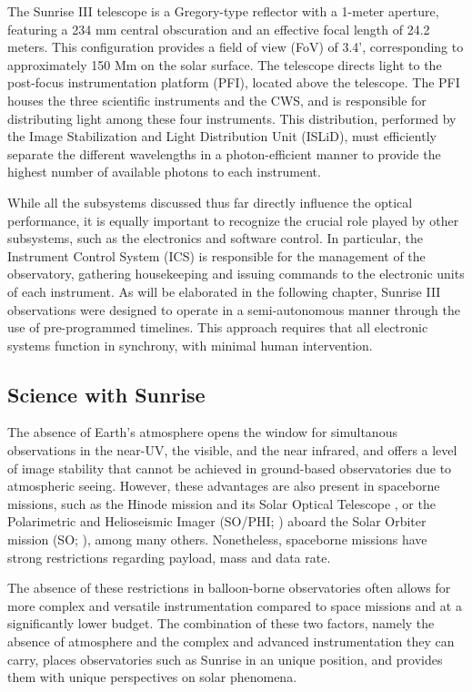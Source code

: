 The Sunrise III telescope is a Gregory-type reflector with a 1-meter aperture, featuring a 234 mm central obscuration and an effective focal length of 24.2 meters. This configuration provides a field of view (FoV) of 3.4', corresponding to approximately 150 Mm on the solar surface. The telescope directs light to the post-focus instrumentation platform (PFI), located above the telescope. The PFI houses the three scientific instruments and the CWS, and is responsible for distributing light among these four instruments. This distribution, performed by the Image Stabilization and Light Distribution Unit (ISLiD), must efficiently separate the different wavelengths in a photon-efficient manner to provide the highest number of available photons to each instrument. 

While all the subsystems discussed thus far directly influence the optical performance, it is equally important to recognize the crucial role played by other subsystems, such as the electronics and software control. In particular, the Instrument Control System (ICS) is responsible for the management of the observatory, gathering housekeeping and issuing commands to the electronic units of each instrument. As will be elaborated in the following chapter, Sunrise III observations were designed to operate in a semi-autonomous manner through the use of pre-programmed timelines. This approach requires that all electronic systems function in synchrony, with minimal human intervention. 

\subsection{Science with Sunrise}

The absence of Earth's atmosphere opens the window for simultanous observations in the near-UV, the visible, and the near infrared, and offers a level of image stability that cannot be achieved in ground-based observatories due to atmospheric seeing. However, these advantages are also present in spaceborne missions, such as the Hinode mission \citep{Hinode} and its Solar Optical Telescope \citep{sot}, or the Polarimetric and Helioseismic Imager (SO/PHI; \citealt{PHI}) aboard the Solar Orbiter mission (SO; \citealt{SO}), among many others. Nonetheless, spaceborne missions have strong restrictions regarding payload, mass and data rate. 

The absence of these restrictions in balloon-borne observatories often allows for more complex and versatile instrumentation compared to space missions and at a significantly lower budget. The combination of these two factors, namely the absence of atmosphere and the complex and advanced instrumentation they can carry, places observatories such as Sunrise in an unique position, and provides them with unique perspectives on solar phenomena.

